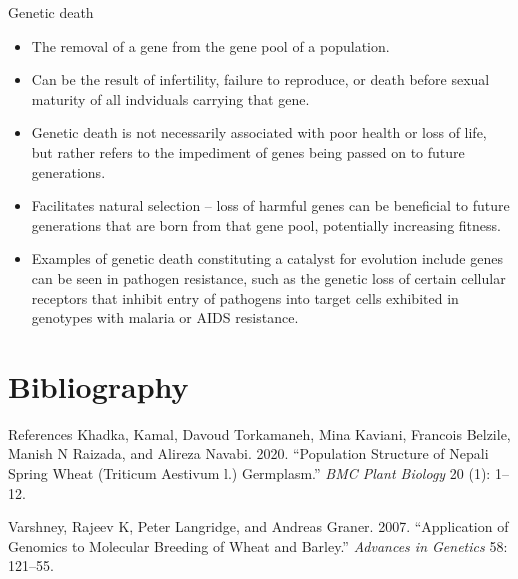\documentclass[11pt,dvipsnames,ignorenonframetext,aspectratio=169]{beamer}
\providecommand{\tightlist}{%
  \setlength{\itemsep}{0pt}\setlength{\parskip}{0pt}}
\newlength{\cslhangindent}
\newenvironment{CSLReferences}%
  {\setlength{\parindent}{0pt}%
  \everypar{\setlength{\hangindent}{\cslhangindent}}\ignorespaces}%
  {\par}
\begin{document}
\begin{frame}{Genetic death}
\protect\hypertarget{genetic-death}{}
\begin{itemize}
\tightlist
\item
  The removal of a gene from the gene pool of a population.
\item
  Can be the result of infertility, failure to reproduce, or death
  before sexual maturity of all indviduals carrying that gene.
\item
  Genetic death is not necessarily associated with poor health or loss
  of life, but rather refers to the impediment of genes being passed on
  to future generations.
\item
  Facilitates natural selection -- loss of harmful genes can be
  beneficial to future generations that are born from that gene pool,
  potentially increasing fitness.
\item
  Examples of genetic death constituting a catalyst for evolution
  include genes can be seen in pathogen resistance, such as the genetic
  loss of certain cellular receptors that inhibit entry of pathogens
  into target cells exhibited in genotypes with malaria or AIDS
  resistance.
\end{itemize}
\end{frame}

\hypertarget{bibliography}{%
\section{Bibliography}\label{bibliography}}

\begin{frame}{References}
\protect\hypertarget{references}{}
\hypertarget{refs}{}
\begin{CSLReferences}{1}{0}
\leavevmode{}%
Khadka, Kamal, Davoud Torkamaneh, Mina Kaviani, Francois Belzile, Manish
N Raizada, and Alireza Navabi. 2020. {``Population Structure of Nepali
Spring Wheat (Triticum Aestivum l.) Germplasm.''} \emph{BMC Plant
Biology} 20 (1): 1--12.

\leavevmode{}%
Varshney, Rajeev K, Peter Langridge, and Andreas Graner. 2007.
{``Application of Genomics to Molecular Breeding of Wheat and Barley.''}
\emph{Advances in Genetics} 58: 121--55.

\end{CSLReferences}
\end{frame}
\end{document}

